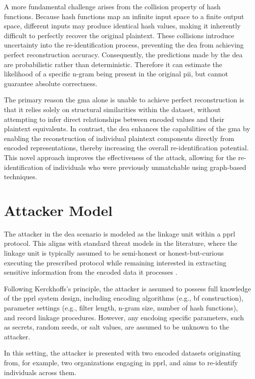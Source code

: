 A more fundamental challenge arises from the collision property of hash functions.
Because hash functions map an infinite input space to a finite output space, different inputs may produce identical hash values, making it inherently difficult to perfectly recover the original plaintext.
These collisions introduce uncertainty into the re-identification process, preventing the \ac{dea} from achieving perfect reconstruction accuracy.
Consequently, the predictions made by the \ac{dea} are probabilistic rather than deterministic. Therefore it can estimate the likelihood of a specific n-gram being present in the original \ac{pii}, but cannot guarantee absolute correctness.

The primary reason the \ac{gma} alone is unable to achieve perfect reconstruction is that it relies solely on structural similarities within the dataset, without attempting to infer direct relationships between encoded values and their plaintext equivalents.
In contrast, the \ac{dea} enhances the capabilities of the \ac{gma} by enabling the reconstruction of individual plaintext components directly from encoded representations, thereby increasing the overall re-identification potential.
This novel approach improves the effectiveness of the attack, allowing for the re-identification of individuals who were previously unmatchable using graph-based techniques.


\section{Attacker Model}

The attacker in the \ac{dea} scenario is modeled as the linkage unit within a \ac{pprl} protocol.
This aligns with standard threat models in the literature, where the linkage unit is typically assumed to be semi-honest or honest-but-curious executing the prescribed protocol while remaining interested in extracting sensitive information from the encoded data it processes \cite{schaefer2024}.

Following Kerckhoffs’s principle, the attacker is assumed to possess full knowledge of the \ac{pprl} system design, including encoding algorithms (e.g., \ac{bf} construction), parameter settings (e.g., filter length, n-gram size, number of hash functions), and record linkage procedures.
However, any encdoing specific parameters, such as secrets, random seeds, or salt values, are assumed to be unknown to the attacker.

In this setting, the attacker is presented with two encoded datasets originating from, for example, two organizations engaging in \ac{pprl}, and aims to re-identify individuals across them.

